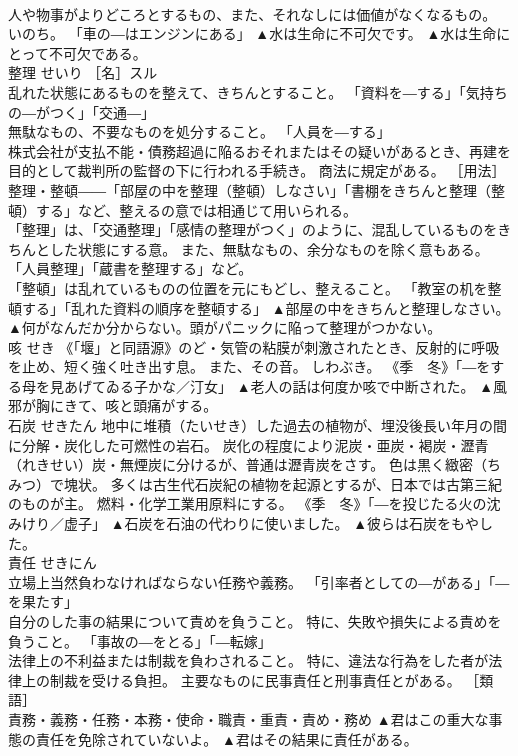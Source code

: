 \documentclass[8pt]{extreport}
\begin{document}
\begin{CJK}{UTF8}{min}
\\	人や物事がよりどころとするもの、また、それなしには価値がなくなるもの。 いのち。 「車の―はエンジンにある」	▲水は生命に不可欠です。 ▲水は生命にとって不可欠である。
\\	整理	せいり	［名］スル 
\\	乱れた状態にあるものを整えて、きちんとすること。 「資料を―する」「気持ちの―がつく」「交通―」 
\\	無駄なもの、不要なものを処分すること。 「人員を―する」 
\\	株式会社が支払不能・債務超過に陥るおそれまたはその疑いがあるとき、再建を目的として裁判所の監督の下に行われる手続き。 商法に規定がある。 ［用法］整理・整頓――「部屋の中を整理（整頓）しなさい」「書棚をきちんと整理（整頓）する」など、整えるの意では相通じて用いられる。 
\\	「整理」は、「交通整理」「感情の整理がつく」のように、混乱しているものをきちんとした状態にする意。 また、無駄なもの、余分なものを除く意もある。 「人員整理」「蔵書を整理する」など。 
\\	「整頓」は乱れているものの位置を元にもどし、整えること。 「教室の机を整頓する」「乱れた資料の順序を整頓する」	▲部屋の中をきちんと整理しなさい。 ▲何がなんだか分からない。頭がパニックに陥って整理がつかない。
\\	咳	せき	《「堰」と同語源》のど・気管の粘膜が刺激されたとき、反射的に呼吸を止め、短く強く吐き出す息。 また、その音。 しわぶき。 《季　冬》「―をする母を見あげてゐる子かな／汀女」	▲老人の話は何度か咳で中断された。 ▲風邪が胸にきて、咳と頭痛がする。
\\	石炭	せきたん	地中に堆積（たいせき）した過去の植物が、埋没後長い年月の間に分解・炭化した可燃性の岩石。 炭化の程度により泥炭・亜炭・褐炭・瀝青（れきせい）炭・無煙炭に分けるが、普通は瀝青炭をさす。 色は黒く緻密（ちみつ）で塊状。 多くは古生代石炭紀の植物を起源とするが、日本では古第三紀のものが主。 燃料・化学工業用原料にする。 《季　冬》「―を投じたる火の沈みけり／虚子」	▲石炭を石油の代わりに使いました。 ▲彼らは石炭をもやした。
\\	責任	せきにん	
\\	立場上当然負わなければならない任務や義務。 「引率者としての―がある」「―を果たす」 
\\	自分のした事の結果について責めを負うこと。 特に、失敗や損失による責めを負うこと。 「事故の―をとる」「―転嫁」 
\\	法律上の不利益または制裁を負わされること。 特に、違法な行為をした者が法律上の制裁を受ける負担。 主要なものに民事責任と刑事責任とがある。 ［類語］
\\	責務・義務・任務・本務・使命・職責・重責・責め・務め	▲君はこの重大な事態の責任を免除されていないよ。 ▲君はその結果に責任がある。

\end{CJK}
\end{document}
